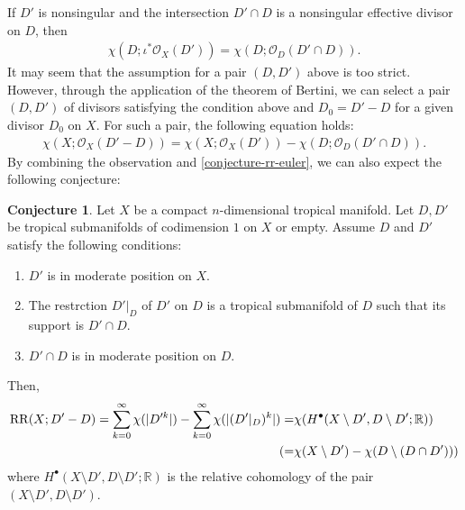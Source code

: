 \documentclass[a4paper,dvipdfmx,reqno,12pt]{amsart}
\theoremstyle{definition}
\newtheorem{conjecture}[theorem]{Conjecture}
\newcommand{\opn}[1]{\operatorname{#1}}
\numberwithin{equation}{section}
\begin{document}
If $D'$ is nonsingular and the intersection
$D'\cap D$ is a nonsingular effective divisor
on $D$, then
\begin{align}
\chi(D;\iota^{*}\mathcal{O}_X(D'))=\chi(D;\mathcal{O}_D(D'\cap D)).
\end{align}
It may seem that 
the assumption for a pair $(D,D')$ above is
too strict.
However, through the application of the theorem of
Bertini, we can select a pair $(D,D')$ of divisors 
satisfying the condition above 
and $D_0=D'-D$ for a given divisor $D_0$ on $X$.
For such a pair, the following equation holds:
\begin{align}
\chi(X;\mathcal{O}_X(D'-D))=
\chi(X;\mathcal{O}_X(D'))-
\chi(D;\mathcal{O}_D(D'\cap D)).
\end{align}
By combining the observation and \cref{conjecture-rr-euler}, 
we can also expect the following conjecture:
\begin{conjecture}
\label{conjecture-rr-bertini}
Let $X$ be a compact $n$-dimensional
tropical manifold. 
Let $D,D'$ be tropical submanifolds of codimension $1$
on $X$ or empty.
Assume $D$ and $D'$ satisfy the following conditions:
\begin{enumerate}
\item $D'$ is in moderate position on $X$.
\item The restrction $D'|_{D}$ of $D'$ on $D$ is 
a tropical submanifold of $D$ such that its support is   
$D'\cap D$.
\item $D'\cap D$ is in moderate position on $D$.
\end{enumerate}
Then,
\begin{align}
\label{equation-rr-bertini}
\opn{RR}(X;D'-D)=\sum_{k=0}^{\infty}\chi(|D'^k|)-
\sum_{k=0}^{\infty}\chi(|(D'|_{D})^k|)
=&\chi(H^{\bullet}(X\setminus D',D\setminus D';\mathbb{R})) \notag \\
(=&\chi(X\setminus D')-\chi(D\setminus (D\cap D')))
\end{align}
where $H^{\bullet}(X\setminus D',D\setminus D';\mathbb{R})$
is the relative cohomology of the pair
$(X\setminus D',D\setminus D')$.
\end{conjecture}
\end{document}
